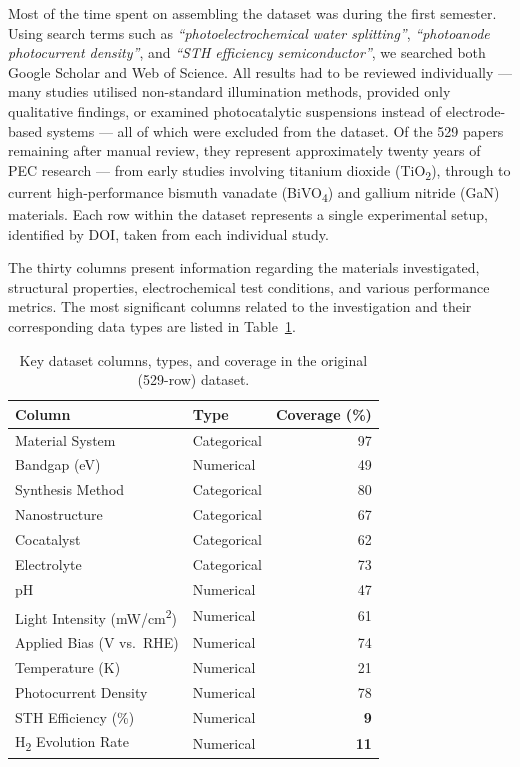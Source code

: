 Most of the time spent on assembling the dataset was during the first semester.
Using search terms such as \emph{``photoelectrochemical water splitting''},
\emph{``photoanode photocurrent density''}, and \emph{``STH efficiency semiconductor''},
we searched both Google Scholar and Web of Science.
All results had to be reviewed individually --- many studies utilised non-standard
illumination methods, provided only qualitative findings, or examined photocatalytic
suspensions instead of electrode-based systems --- all of which were excluded from
the dataset.
Of the 529 papers remaining after manual review, they represent approximately
twenty years of PEC research --- from early studies involving titanium dioxide
(TiO\textsubscript{2}), through to current high-performance bismuth vanadate
(BiVO\textsubscript{4}) and gallium nitride (GaN) materials.
Each row within the dataset represents a single experimental setup, identified by
DOI, taken from each individual study.

The thirty columns present information regarding the materials investigated,
structural properties, electrochemical test conditions, and various performance
metrics.
The most significant columns related to the investigation and their corresponding
data types are listed in Table~\ref{tab:columns}.

\begin{table}[htb]
\centering
\caption{Key dataset columns, types, and coverage in the original (529-row) dataset.}
\label{tab:columns}
\begin{tabular}{llr}
\toprule
Column & Type & Coverage (\%) \\
\midrule
Material System              & Categorical & 97 \\
Bandgap (eV)                 & Numerical   & 49 \\
Synthesis Method             & Categorical & 80 \\
Nanostructure                & Categorical & 67 \\
Cocatalyst                   & Categorical & 62 \\
Electrolyte                  & Categorical & 73 \\
pH                           & Numerical   & 47 \\
Light Intensity (mW/cm\textsuperscript{2}) & Numerical & 61 \\
Applied Bias (V vs.\ RHE)   & Numerical   & 74 \\
Temperature (K)              & Numerical   & 21 \\
Photocurrent Density         & Numerical   & 78 \\
STH Efficiency (\%)          & Numerical   & \textbf{9} \\
H\textsubscript{2} Evolution Rate & Numerical & \textbf{11} \\
\bottomrule
\end{tabular}
\end{table}

